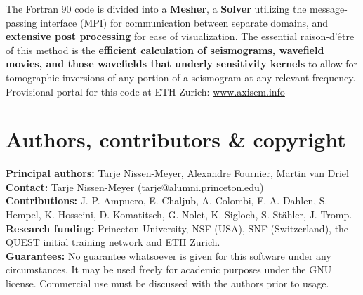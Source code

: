 \documentclass[11pt,letter,fleqn,english,notitlepage]{article}
\begin{document}
The Fortran 90 code is divided into a \textbf{Mesher}, a \textbf{Solver}
utilizing the message-passing interface (MPI) for communication between
separate domains, and \textbf{extensive post processing} for ease of
visualization.
The essential raison-d'\^{e}tre of this method is the \textbf{efficient
calculation of seismograms, wavefield movies, and those wavefields that underly
sensitivity kernels} to allow for tomographic inversions of any portion of a
seismogram at any relevant frequency. \\

\noindent Provisional portal for this code at ETH Zurich:
\url{www.axisem.info}

\section{Authors, contributors \& copyright}
%
\noindent \textbf{Principal authors:} Tarje Nissen-Meyer, Alexandre Fournier, Martin van Driel\\
\noindent \textbf{Contact:} Tarje Nissen-Meyer (\url{tarje@alumni.princeton.edu})\\
\noindent \textbf{Contributions:}
 J.-P. Ampuero, E. Chaljub, A. Colombi, F. A. Dahlen, S. Hempel, K. Hosseini, D. Komatitsch,
 G. Nolet, K. Sigloch, S. St\"{a}hler, J. Tromp.\\
\noindent \textbf{Research funding:} Princeton University, NSF (USA), SNF (Switzerland), 
the QUEST initial training network and ETH Zurich.\\
\noindent \textbf{Guarantees:} No guarantee whatsoever is given for this
software under any circumstances. It may be used freely for academic purposes
under the GNU license. Commercial use must be discussed with the authors prior
to usage.\\
\end{document}
